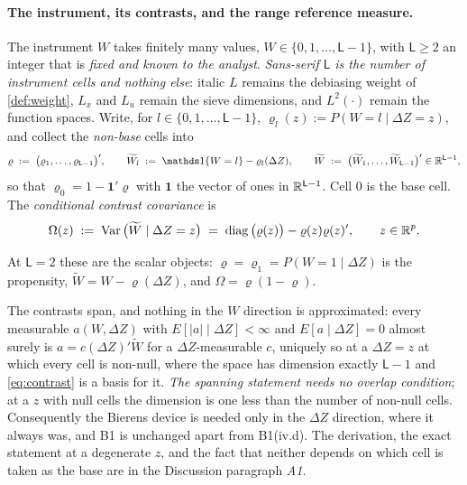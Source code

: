 \paragraph{The instrument, its contrasts, and the range reference measure.}
The instrument $W$ takes finitely many values, $W\in\{0,1,\dots,\mathsf L-1\}$, with
$\mathsf L\ge2$ an integer that is \emph{fixed and known to the analyst}. \emph{Sans-serif
$\mathsf L$ is the number of instrument cells and nothing else}: italic $L$ remains the debiasing
weight of \cref{def:weight}, $L_x$ and $L_u$ remain the sieve dimensions, and $L^{2}(\cdot)$ remain the
function spaces. Write, for $l\in\{0,1,\dots,\mathsf L-1\}$,
$\varrho_l(z):=P(W=l\mid\Delta Z=z)$, and collect the \emph{non-base} cells into
\begin{equation}\label{eq:contrast}
\varrho\;:=\;\big(\varrho_1,\dots,\varrho_{\mathsf L-1}\big)',
\qquad
\widetilde W_l\;:=\;\un\{W=l\}-\varrho_l(\Delta Z),
\qquad
\widetilde W\;:=\;\big(\widetilde W_1,\dots,\widetilde W_{\mathsf L-1}\big)'\in\IR^{\mathsf L-1},
\end{equation}
so that $\varrho_0=1-\mathbf 1'\varrho$ with $\mathbf 1$ the vector of ones in $\mathbb{R}^{\mathsf L-1}$.
Cell $0$ is the base cell. The \emph{conditional contrast covariance} is
\begin{equation}\label{eq:omegadef}
\Omega(z)\;:=\;\operatorname{Var}\big(\widetilde W\mid\Delta Z=z\big)\;=\;\operatorname{diag}\big(\varrho(z)\big)-\varrho(z)\varrho(z)' ,
\qquad z\in\mathbb{R}^{p} .
\end{equation}

At $\mathsf L=2$ these are the scalar objects: $\varrho=\varrho_1=P(W=1\mid\Delta Z)$ is the propensity,
$\widetilde W=W-\varrho(\Delta Z)$, and $\Omega=\varrho(1-\varrho)$.

The contrasts span, and nothing in the $W$ direction is approximated: every measurable
$a(W,\Delta Z)$ with $E[|a|\mid\Delta Z]<\infty$ and $E[a\mid\Delta Z]=0$ almost surely is
$a=c(\Delta Z)'\widetilde W$ for a $\Delta Z$-measurable $c$, uniquely so at a $\Delta Z=z$ at which
every cell is non-null, where the space has dimension exactly $\mathsf L-1$ and \eqref{eq:contrast} is
a basis for it. \emph{The spanning statement needs no overlap condition}; at a $z$ with null cells the
dimension is one less than the number of non-null cells. Consequently the Bierens device is needed only
in the $\Delta Z$ direction, where it always was, and B1 is unchanged apart from B1(iv.d). The
derivation, the exact statement at a degenerate $z$, and the fact that neither depends on which cell is
taken as the base are in the Discussion paragraph \emph{A1}.

